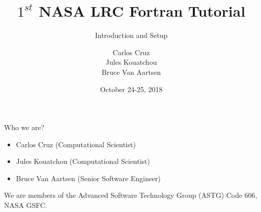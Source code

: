 \documentclass[11pt]{beamer}
\title{$1^{st}$ NASA LRC Fortran Tutorial}
\subtitle{Introduction and Setup}
\author{Carlos Cruz\\
Jules Kouatchou\\
Bruce Van Aartsen}
\institute{
  NASA GSFC Code 606 (ASTG)\\
  Greenbelt, Maryland 20771\\[1ex]}
\date{October 24-25, 2018}
\begin{document}
\begin{frame}[plain]
  \titlepage
\end{frame}



\begin{frame}{Who we are?}

\begin{itemize}
    \item Carlos Cruz (Computational Scientist)
    \item Jules Kouatchou (Computational Scientist)
    \item Bruce Van Aartsen (Senior Software Engineer)
\end{itemize}
We are members of the Advanced Software Technology Group (ASTG) Code 606, NASA GSFC.

\end{frame}

\end{document}
